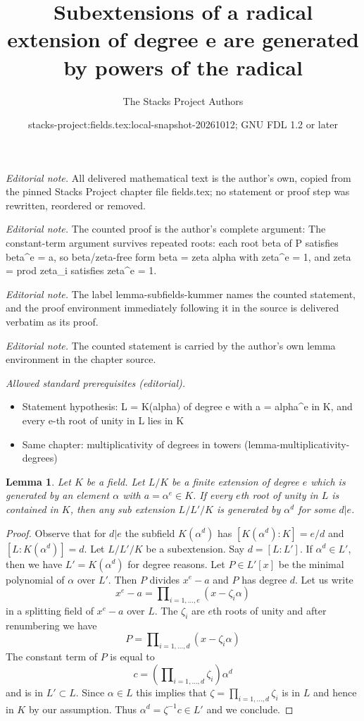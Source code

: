 \documentclass[10pt,a4paper]{amsart}
\title{Subextensions of a radical extension of degree e are generated by powers of the radical}
\author{The Stacks Project Authors}
\date{stacks-project:fields.tex:local-snapshot-20261012; GNU FDL 1.2 or later}
\newenvironment{reference}{\comment}{\endcomment}
\theoremstyle{plain}
\newtheorem{lemma}[subsection]{Lemma}
\theoremstyle{definition}
\theoremstyle{remark}
\numberwithin{equation}{subsection}
\begin{document}
\maketitle
\noindent\textit{Editorial note.} All delivered mathematical text is the author's own, copied from the pinned Stacks Project chapter file fields.tex; no statement or proof step was rewritten, reordered or removed.\par\medskip
\noindent\textit{Editorial note.} The counted proof is the author's complete argument: The constant-term argument survives repeated roots: each root beta of P satisfies beta\textasciicircum{}e = a, so beta/zeta-free form beta = zeta alpha with zeta\textasciicircum{}e = 1, and zeta = prod zeta\_i satisfies zeta\textasciicircum{}e = 1.\par\medskip
\noindent\textit{Editorial note.} The label lemma-subfields-kummer names the counted statement, and the proof environment immediately following it in the source is delivered verbatim as its proof.\par\medskip
\noindent\textit{Editorial note.} The counted statement is carried by the author's own lemma environment in the chapter source.\par\medskip
\noindent\textit{Allowed standard prerequisites (editorial).}\begin{itemize}
\item Statement hypothesis: L = K(alpha) of degree e with a = alpha\textasciicircum{}e in K, and every e-th root of unity in L lies in K
\item Same chapter: multiplicativity of degrees in towers (lemma-multiplicativity-degrees)
\end{itemize}\medskip
\begin{lemma}
\label{lemma-subfields-kummer}
\begin{reference}
\cite[Theorem 5.2]{Radical}
\end{reference}
Let $K$ be a field. Let $L/K$ be a finite extension of degree $e$
which is generated by an element $\alpha$ with $a = \alpha^e \in K$.
If every $e$th root of unity in $L$ is contained in $K$, then 
any sub extension $L/L'/K$ is generated by $\alpha^d$ for some $d | e$.
\end{lemma}

\begin{proof}
Observe that for $d | e$ the subfield $K(\alpha^d)$ has
$[K(\alpha^d) : K] = e/d$ and $[L : K(\alpha^d)] = d$.
Let $L/L'/K$ be a subextension. Say $d = [L : L']$. If $\alpha^d \in L'$,
then we have $L' = K(\alpha^d)$ for degree reasons.
Let $P \in L'[x]$ be the minimal polynomial of $\alpha$ over $L'$.
Then $P$ divides $x^e - a$ and $P$ has degree $d$.
Let us write
$$
x^e - a = \prod\nolimits_{i = 1, \ldots, e} (x - \zeta_i \alpha)
$$
in a splitting field of $x^e - a$ over $L$. The $\zeta_i$ are $e$th roots
of unity and after renumbering we have
$$
P = \prod\nolimits_{i = 1, \ldots, d} (x - \zeta_i \alpha)
$$
The constant term of $P$ is equal to
$$
c = (\prod\nolimits_{i = 1, \ldots, d} \zeta_i) \alpha^d
$$
and is in $L' \subset L$. Since $\alpha \in L$ this implies that
$\zeta = \prod_{i = 1, \ldots, d} \zeta_i$ is in $L$ and hence in $K$ by
our assumption. Thus $\alpha^d = \zeta^{-1}c \in L'$ and we conclude.
\end{proof}
\end{document}
